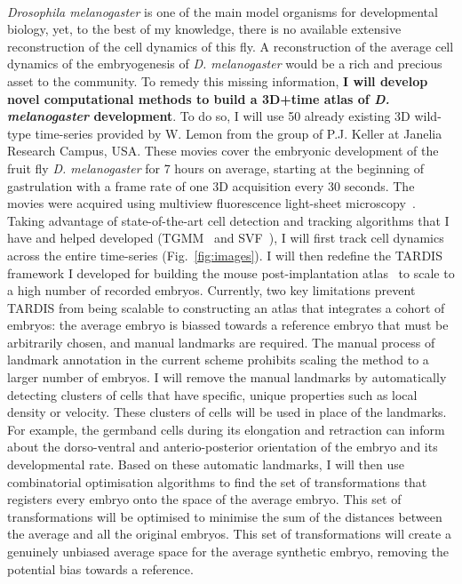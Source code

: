 \paragraph{}\textit{Drosophila melanogaster} is one of the main model organisms for developmental biology, yet, to the best of my knowledge, there is no available extensive reconstruction of the cell dynamics of this fly.
A reconstruction of the average cell dynamics of the embryogenesis of \textit{D. melanogaster} would be a rich and precious asset to the community.
To remedy this missing information, \textbf{I will develop novel computational methods to build a 3D+time atlas of \textit{D. melanogaster} development}.
To do so, I will use 50 already existing 3D wild-type time-series provided by W. Lemon from the group of P.J. Keller at Janelia Research Campus, USA\@. These movies cover the embryonic development of the fruit fly \textit{D. melanogaster} for 7 hours on average, starting at the beginning of gastrulation with a frame rate of one 3D acquisition every 30 seconds.
The movies were acquired using multiview fluorescence light-sheet microscopy~\cite{Royer2016}.
Taking advantage of state-of-the-art cell detection and tracking algorithms that I have and helped developed (TGMM~\cite{Amat:2014aa} and SVF~\cite{McDole:2018aa}), I will first track cell dynamics across the entire time-series (Fig.~\ref{fig:images}).
I will then redefine the TARDIS framework I developed for building the mouse post-implantation atlas~\cite{McDole:2018aa} to scale to a high number of recorded embryos.
Currently, two key limitations prevent TARDIS from being scalable to constructing an atlas that integrates a cohort of embryos: the average embryo is biassed towards a reference embryo that must be arbitrarily chosen, and manual landmarks are required.
The manual process of landmark annotation in the current scheme prohibits scaling the method to a larger number of embryos.
I will remove the manual landmarks by automatically detecting clusters of cells that have specific, unique properties such as local density or velocity.
These clusters of cells will be used in place of the landmarks.
For example, the germband cells during its elongation and retraction can inform about the dorso-ventral and anterio-posterior orientation of the embryo and its developmental rate.
Based on these automatic landmarks, I will then use combinatorial optimisation algorithms to find the set of transformations that registers every embryo onto the space of the average embryo.
This set of transformations will be optimised to minimise the sum of the distances between the average and all the original embryos.
This set of transformations will create a genuinely unbiased average space for the average synthetic embryo, removing the potential bias towards a reference.

